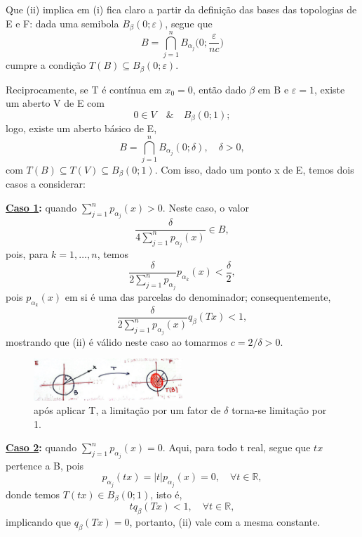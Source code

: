 \documentclass[../distribution_theory_notes.tex]{subfiles}
\begin{document}
    \begin{proof*}
      Que (ii) implica em (i) fica claro a partir da definição das bases das topologias de E e F: dada uma semibola \(B_{\beta }(0; \varepsilon )\), segue que 
        \[
          B=\bigcap_{j=1}^{n}B_{\alpha_{j}}\biggl(0; \frac{\varepsilon }{nc}\biggr)
        \]
        cumpre a condição \(T(B)\subseteq B_{\beta }(0; \varepsilon )\).

        Reciprocamente, se T é contínua em \(x_{0}=0\), então dado \(\beta \) em B e \(\varepsilon =1\), existe um aberto V de E com 
          \[
            0\in V \quad\&\quad B_{\beta }(0; 1);
          \]
          logo, existe um aberto básico de E,
            \[
              B=\bigcap_{j=1}^{n}B_{\alpha_{j}}(0; \delta ),\quad \delta >0,
            \]
            com \(T(B)\subseteq T(V)\subseteq B_{\beta }(0;1).\) Com isso, dado um ponto x de E, temos dois casos a considerar: 

            \textbf{\underline{Caso 1}:} quando \(\sum\limits_{j=1}^{n}p_{\alpha_{j}}(x)>0\). Neste caso, o valor 
              \[
                \frac{\delta }{4 \sum\limits_{j=1}^{n}p_{\alpha_{j}}(x)}\in B,
              \]
              pois, para \(k=1,\dotsc ,n\), temos 
                \[
                  \frac{\delta }{2\sum\limits_{j=1}^{n}p_{\alpha_{j}}} p_{\alpha_{k}}(x)<\frac{\delta }{2}, 
                  
                \]
                pois \(p_{\alpha_{k}}(x)\) em si é uma das parcelas do denominador; consequentemente, 
                  \[
                    \frac{\delta }{2\sum\limits_{j=1}^{n}p_{\alpha_{j}}(x)} q_{\beta}(Tx)<1,
                  \]
                  mostrando que (ii) é válido neste caso ao tomarmos \(c=2/\delta >0.\)
                 \begin{figure}[H]
                 \begin{center}
                 \includegraphics[height=0.5\textheight, width=0.5\textwidth, keepaspectratio]{./Images/application_05.png}
                 \end{center}
                 \caption{após aplicar T, a limitação por um fator de \(\delta \) torna-se limitação por 1.}
                 \end{figure}

            \textbf{\underline{Caso 2}:} quando \(\sum\limits_{j=1}^{n}p_{\alpha_{j}}(x)=0.\) Aqui, para todo t real, segue que \(tx\) pertence a B, pois 
              \[
                p_{\alpha_{j}}(tx)=|t|p_{\alpha_{j}}(x)=0, \quad \forall t\in \mathbb{R},
              \]
              donde temos \(T(tx)\in B_{\beta }(0; 1)\), isto é, 
                \[
                  tq_{\beta }(Tx)<1,\quad \forall t\in \mathbb{R},
                \]
                implicando que \(q_{\beta }(Tx)=0\), portanto, (ii) vale com a mesma constante. \qedsymbol
    \end{proof*}
\end{document}
